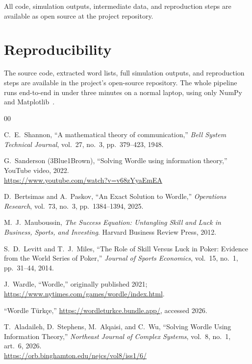 \documentclass[conference]{IEEEtran}
\begin{document}
All code, simulation outputs, intermediate data, and reproduction
steps are available as open source at the project repository.

\section*{Reproducibility}

The source code, extracted word lists, full simulation outputs, and
reproduction steps are available in the project's open-source
repository. The whole pipeline runs end-to-end in under three minutes on
a normal laptop, using only NumPy~\cite{harris2020numpy} and
Matplotlib~\cite{hunter2007matplotlib}.

\balance
\begin{thebibliography}{00}

C.~E.~Shannon, ``A mathematical theory of communication,''
\textit{Bell System Technical Journal}, vol.~27, no.~3, pp.~379--423, 1948.

G.~Sanderson (3Blue1Brown), ``Solving Wordle using information theory,''
YouTube video, 2022.\\
\url{https://www.youtube.com/watch?v=v68zYyaEmEA}

D.~Bertsimas and A.~Paskov,
``An Exact Solution to Wordle,''
\textit{Operations Research}, vol.~73, no.~3, pp.~1384--1394, 2025.

M.~J.~Mauboussin, \textit{The Success Equation: Untangling Skill and
Luck in Business, Sports, and Investing}. Harvard Business Review Press,
2012.

S.~D.~Levitt and T.~J.~Miles, ``The Role of Skill Versus Luck in Poker:
Evidence from the World Series of Poker,''
\textit{Journal of Sports Economics}, vol.~15, no.~1, pp.~31--44, 2014.

J.~Wardle, ``Wordle,'' originally published 2021;
\url{https://www.nytimes.com/games/wordle/index.html}.

``Wordle Türkçe,'' \url{https://wordleturkce.bundle.app/}, accessed 2026.

T.~Aladaileh, D.~Stephens, M.~Alqaisi, and C.~Wu,
``Solving Wordle Using Information Theory,''
\textit{Northeast Journal of Complex Systems}, vol.~8, no.~1, art.~6, 2026.\\
\url{https://orb.binghamton.edu/nejcs/vol8/iss1/6/}


\end{thebibliography}
\end{document}
